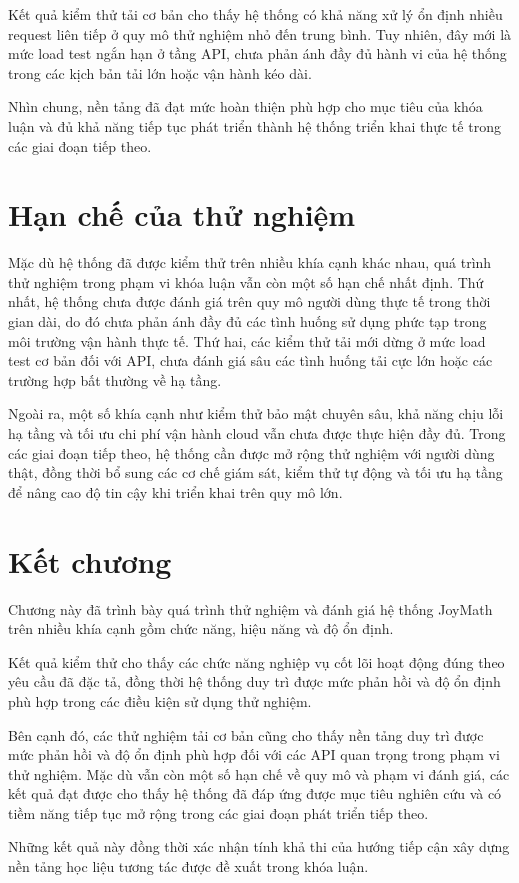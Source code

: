 Kết quả kiểm thử tải cơ bản cho thấy hệ thống có khả năng xử lý ổn định nhiều request liên tiếp ở quy mô thử nghiệm nhỏ đến trung bình. Tuy nhiên, đây mới là mức load test ngắn hạn ở tầng API, chưa phản ánh đầy đủ hành vi của hệ thống trong các kịch bản tải lớn hoặc vận hành kéo dài.

Nhìn chung, nền tảng đã đạt mức hoàn thiện phù hợp cho mục tiêu của khóa luận và đủ khả năng tiếp tục phát triển thành hệ thống triển khai thực tế trong các giai đoạn tiếp theo.

\section{Hạn chế của thử nghiệm}

Mặc dù hệ thống đã được kiểm thử trên nhiều khía cạnh khác nhau, quá trình thử nghiệm trong phạm vi khóa luận vẫn còn một số hạn chế nhất định. Thứ nhất, hệ thống chưa được đánh giá trên quy mô người dùng thực tế trong thời gian dài, do đó chưa phản ánh đầy đủ các tình huống sử dụng phức tạp trong môi trường vận hành thực tế. Thứ hai, các kiểm thử tải mới dừng ở mức load test cơ bản đối với API, chưa đánh giá sâu các tình huống tải cực lớn hoặc các trường hợp bất thường về hạ tầng.

Ngoài ra, một số khía cạnh như kiểm thử bảo mật chuyên sâu, khả năng chịu lỗi hạ tầng và tối ưu chi phí vận hành cloud vẫn chưa được thực hiện đầy đủ. Trong các giai đoạn tiếp theo, hệ thống cần được mở rộng thử nghiệm với người dùng thật, đồng thời bổ sung các cơ chế giám sát, kiểm thử tự động và tối ưu hạ tầng để nâng cao độ tin cậy khi triển khai trên quy mô lớn.

\section{Kết chương}

Chương này đã trình bày quá trình thử nghiệm và đánh giá hệ thống JoyMath trên nhiều khía cạnh gồm chức năng, hiệu năng và độ ổn định.

Kết quả kiểm thử cho thấy các chức năng nghiệp vụ cốt lõi hoạt động đúng theo yêu cầu đã đặc tả, đồng thời hệ thống duy trì được mức phản hồi và độ ổn định phù hợp trong các điều kiện sử dụng thử nghiệm.

Bên cạnh đó, các thử nghiệm tải cơ bản cũng cho thấy nền tảng duy trì được mức phản hồi và độ ổn định phù hợp đối với các API quan trọng trong phạm vi thử nghiệm. Mặc dù vẫn còn một số hạn chế về quy mô và phạm vi đánh giá, các kết quả đạt được cho thấy hệ thống đã đáp ứng được mục tiêu nghiên cứu và có tiềm năng tiếp tục mở rộng trong các giai đoạn phát triển tiếp theo.

Những kết quả này đồng thời xác nhận tính khả thi của hướng tiếp cận xây dựng nền tảng học liệu tương tác được đề xuất trong khóa luận.
